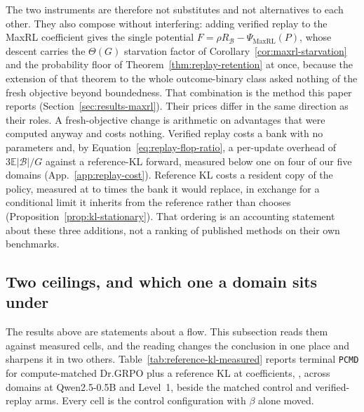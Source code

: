 \documentclass{article}
\newcommand{\1}{\mathbf 1}
\newcommand{\E}{\mathbb E}
\newcommand{\pmd}{\texttt{PCMD}}
\theoremstyle{remark}
\theoremstyle{definition}
\theoremstyle{plain}
\begin{document}
The two instruments are therefore not substitutes and not alternatives to each
other. They also compose without interfering: adding verified replay to the
MaxRL coefficient gives the single potential
$F=\rho R_{\mathcal B}-\Psi_{\mathrm{MaxRL}}(P)$, whose descent carries the
$\Theta(G)$ starvation factor of Corollary~\ref{cor:maxrl-starvation} and the
probability floor of Theorem~\ref{thm:replay-retention} at once, because the
extension of that theorem to the whole outcome-binary class asked nothing of
the fresh objective beyond boundedness. That combination is the method this
paper reports (Section~\ref{sec:results-maxrl}). Their prices differ in the same direction as
their roles. A fresh-objective change is arithmetic on advantages that were
computed anyway and costs nothing. Verified replay costs a bank with no
parameters and, by Equation~\eqref{eq:replay-flop-ratio}, a per-update
overhead of $3\E|\mathcal B|/G$ against a reference-KL forward, measured below
one on four of our five domains (App.~\ref{app:replay-cost}). Reference KL
costs a resident copy of the policy, measured at \MDcostStateMin{} to
\MDcostStateMax{} times the bank it would replace, in exchange for a
conditional limit it inherits from the reference rather than chooses
(Proposition~\ref{prop:kl-stationary}). That ordering is an accounting
statement about these three additions, not a ranking of published methods on
their own benchmarks.

\subsection{Two ceilings, and which one a domain sits under}
\label{app:theory-kl-measured}

The results above are statements about a flow. This subsection reads them
against measured cells, and the reading changes the conclusion in one place and
sharpens it in two others. Table~\ref{tab:reference-kl-measured} reports
terminal \pmd{} for compute-matched Dr.GRPO plus a reference KL at
\MDklBetaCount{} coefficients, \MDklBetaList{}, across \MDklDomains{} domains
at Qwen2.5-0.5B and Level~1, beside the matched control and verified-replay
arms. Every cell is the control configuration with $\beta$ alone moved.
\end{document}
